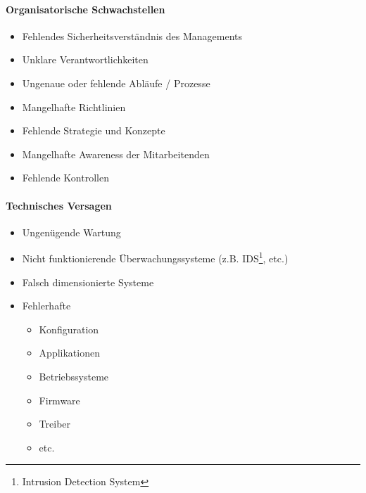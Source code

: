 \paragraph*{Organisatorische Schwachstellen}
\begin{itemize}
    \item Fehlendes Sicherheitsverständnis des Managements
    \item Unklare Verantwortlichkeiten
    \item Ungenaue oder fehlende Abläufe / Prozesse
    \item Mangelhafte Richtlinien
    \item Fehlende Strategie und Konzepte
    \item Mangelhafte Awareness der Mitarbeitenden
    \item Fehlende Kontrollen
\end{itemize}

\paragraph*{Technisches Versagen}
\begin{itemize}
    \item Ungenügende Wartung
    \item Nicht funktionierende Überwachungssysteme (z.B. IDS\footnote{Intrusion Detection System}, etc.)
    \item Falsch dimensionierte Systeme
    \item Fehlerhafte
    \begin{itemize}
        \item Konfiguration
        \item Applikationen
        \item Betriebssysteme
        \item Firmware
        \item Treiber
        \item etc.
    \end{itemize}
\end{itemize}

